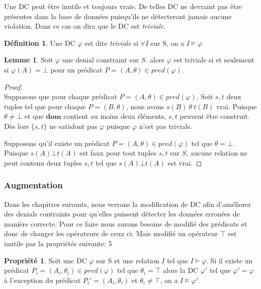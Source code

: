 \documentclass[letterpaper, 12pt]{report}
\theoremstyle{definition}
\newtheorem{mydef}{Définition}
\newtheorem{myprop}{Propriété}
\newtheorem{mylemma}{Lemme}
\newcommand{\dom}{\mathbf{dom}}
\newcommand{\alinea}{
\hspace*{0.5cm}}
\begin{document}
Une DC peut être inutile et toujours vraie. De telles DC ne devraint pas être présentes dans la base de données puisqu'ils ne détecteront jamais aucune violation. Dans ce cas on dira que le DC est \emph{triviale}. 
\begin{mydef}
	Une DC $\varphi$ est dite \emph{triviale} si $\forall I$ sur S, on a $I \models \varphi$
\end{mydef}

\begin{mylemma}
Soit $\varphi$ une denial constraint sur $S$. alors $\varphi$ est triviale si et seulement si $\varphi(A) = \bot$ pour un prédicat $P=(A,\theta) \in pred(\varphi)$.
\end{mylemma}
\begin{proof}
~\\
\alinea \framebox{$\implies$}
Supposons que pour chaque prédicat $P=(A,\theta) \in pred(\varphi)$. Soit $s,t$ deux tuples tel que pour chaque $P=(B,\theta)$, nous avons $s(B)\ \theta\ t(B)$ vrai.
Puisque $\theta \neq \bot$ et que $\dom$ contient au moins deux éléments, $s,t$ peuvent être construit. Dès lors $\{s,t\}$ ne satisfont pas $\varphi$ puisque $\varphi$ n'est pas triviale.

\framebox{$\impliedby$}
Supposons qu'il existe un prédicat $P=(A,\theta) \in pred (\varphi)$ tel que $\theta = \bot$.
Puisque $s(A) \bot t(A)$ est faux pour tout tuples $s,t$ sur $S$, aucune relation ne peut contenu deux tuples $s,t$ tel que $s(A) \bot t(A)$ est vrai.
\end{proof}


\subsubsection{Augmentation}

Dans les chapitres suivants, nous verrons la modification de DC afin d'améliorer des denials contraints pour qu'elles puissent détecter les données erronées de manière correcte. Pour ce faire nous aurons besoins de modifié des prédicats et donc de changer les opérateurs de ceux ci. Mais modifié un opérateur $\top$ est inutile par la propriétés suivante:
5
\begin{myprop}
	Soit une DC $\varphi$ sur S et une relation $I$ tel que $I \models \varphi$. Si il existe un prédicat $P_i = (A_i,\theta_i) \in pred(\varphi)$ tel que $\theta_i = \top$ alors la DC $\varphi'$ tel que $\varphi' = \varphi$ à l'exception du prédicat $P_i' =(A_i,\theta_i)$ et $\theta_i \neq \top$, on a $I \models \varphi'$
\end{myprop}
\end{document}

